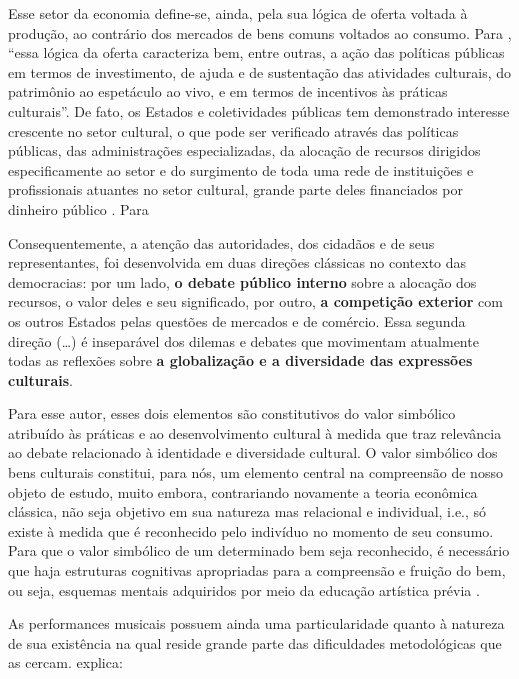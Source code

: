 \documentclass[a4paper, 12pt, openright, oneside, german, french, english, brazil]{abntex2}
\begin{document}
	Esse setor da economia define-se, ainda, pela sua lógica de oferta voltada à produção, ao contrário dos mercados de bens comuns voltados ao consumo. Para , ``essa lógica da oferta caracteriza bem, entre outras, a ação das políticas públicas em termos de investimento, de ajuda e de sustentação das atividades culturais, do patrimônio ao espetáculo ao vivo, e em termos de incentivos às práticas culturais''. De fato, os Estados e coletividades públicas tem demonstrado interesse crescente no setor cultural, o que pode ser verificado através das políticas públicas, das administrações especializadas, da alocação de recursos dirigidos especificamente ao setor e do surgimento de toda uma rede de instituições e profissionais atuantes no setor cultural, grande parte deles financiados por dinheiro público \cite{tolila2007cultura}. Para 

	\begin{citacao}
		Consequentemente, a atenção das autoridades, dos cidadãos e de seus representantes, foi desenvolvida em duas direções clássicas no contexto das democracias: por um lado, \textbf{o debate público interno} sobre a alocação dos recursos, o valor deles e seu significado, por outro, \textbf{a competição exterior} com os outros Estados pelas questões de mercados e de comércio. Essa segunda direção (\ldots) é inseparável dos dilemas e debates que movimentam atualmente todas as reflexões sobre \textbf{a globalização e a diversidade das expressões culturais}. \cite[p. 71-2]{tolila2007cultura}
	\end{citacao}

	Para esse autor, esses dois elementos são constitutivos do valor simbólico atribuído às práticas e ao desenvolvimento cultural à medida que traz relevância ao debate relacionado à identidade e diversidade cultural. O valor simbólico dos bens culturais constitui, para nós, um elemento central na compreensão de nosso objeto de estudo, muito embora, contrariando novamente a teoria econômica clássica, não seja objetivo em sua natureza mas relacional e individual, i.e., só existe à medida que é reconhecido pelo indivíduo no momento de seu consumo. Para que o valor simbólico de um determinado bem seja reconhecido, é necessário que haja estruturas cognitivas apropriadas para a compreensão e fruição do bem, ou seja, esquemas mentais adquiridos por meio da educação artística prévia \cite{bourdieu2003amor}.

	As performances musicais possuem ainda uma particularidade quanto à natureza de sua existência na qual reside grande parte das dificuldades metodológicas que as cercam.  explica:
\end{document}
